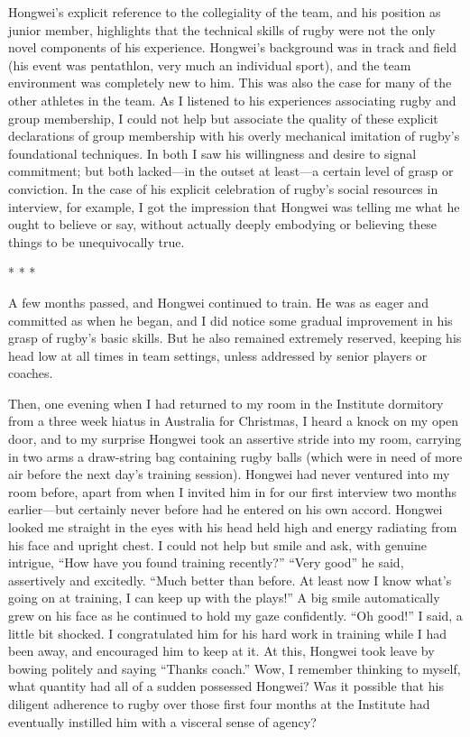 \begin{CJK}{UTF8}{gbsn}
Hongwei's explicit reference to the collegiality of the team, and his position as junior member, highlights that the technical skills of rugby were not the only novel components of his experience.  Hongwei's background was in track and field (his event was pentathlon, very much an individual sport), and the team environment was completely new to him.  This was also the case for many of the other athletes in the team.  As I listened to his experiences associating rugby and group membership, I could not help but associate the quality of these explicit declarations of group membership with his overly mechanical imitation of rugby's foundational techniques.  In both I saw his willingness and desire to signal commitment; but both lacked---in the outset at least---a certain level of grasp or conviction.  In the case of his explicit celebration of rugby's social resources in interview, for example, I got the impression that Hongwei was telling me what he ought to believe or say, without actually deeply embodying or believing these things to be unequivocally true.


                            \begin{center}
                              * * *
                            \end{center}

A few months passed, and Hongwei continued to train.  He was as eager and committed as when he began, and I did notice some gradual improvement in his grasp of rugby's basic skills.  But he also remained extremely reserved, keeping his head low at all times in team settings, unless addressed by senior players or coaches.

Then, one evening when I had returned to my room in the Institute dormitory from a three week hiatus in Australia for Christmas, I heard a knock on my open door, and to my surprise Hongwei took an assertive stride into my room, carrying in two arms a draw-string bag containing rugby balls (which were in need of more air before the next day's training session).  Hongwei had never ventured into my room before, apart from when I invited him in for our first interview two months earlier---but certainly never before had he entered on his own accord.  Hongwei looked me straight in the eyes with his head held high and energy radiating from his face and upright chest.  I could not help but smile and ask, with genuine intrigue, ``How have you found training recently?''
``Very good'' he said, assertively and excitedly.  ``Much better than before.  At least now I know what’s going on at training, I can keep up with the plays!''  A big smile automatically grew on his face as he continued to hold my gaze confidently.  ``Oh good!'' I said, a little bit shocked.  I congratulated him for his hard work in training while I had been away, and encouraged him to keep at it.  At this, Hongwei took leave by bowing politely and saying ``Thanks coach.''  Wow, I remember thinking to myself, what quantity had all of a sudden possessed Hongwei? Was it possible that his diligent adherence to rugby over those first four months at the Institute had eventually instilled him with a visceral sense of agency?


\end{CJK}
